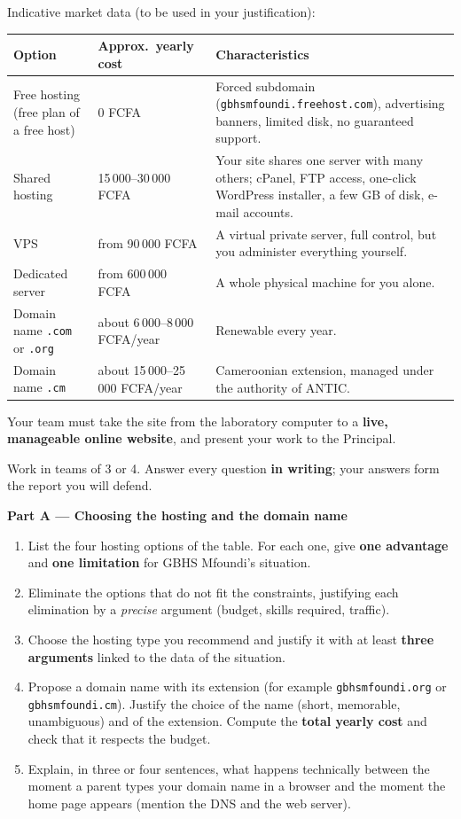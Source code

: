 \documentclass[11pt]{article}
\newcommand{\cle}[1]{{\popxbold\color{popdark}#1}}
\newcounter{popsec}
\newcounter{popsub}
\newcommand{\courssub}[1]{%
  \stepcounter{popsub}%
  \par\vspace{9pt}\noindent{\popxbold\fontsize{11.5}{13}\selectfont\color{popink}{\color{poporange}\thepopsec.\thepopsub}\hspace{6pt}#1}\par\nopagebreak\vspace{4pt}
}
\begin{document}
Indicative market data (to be used in your justification):

\begin{center}
\begin{tabularx}{\linewidth}{|l|X|X|}
\hline
\rowcolor{popblueL} \textbf{Option} & \textbf{Approx.\ yearly cost} & \textbf{Characteristics} \\
\hline
Free hosting (free plan of a free host) & 0 FCFA & Forced subdomain (\texttt{gbhsmfoundi.freehost.com}), advertising banners, limited disk, no guaranteed support. \\
\hline
Shared hosting & 15\,000--30\,000 FCFA & Your site shares one server with many others; cPanel, FTP access, one-click WordPress installer, a few GB of disk, e-mail accounts. \\
\hline
VPS & from 90\,000 FCFA & A virtual private server, full control, but you administer everything yourself. \\
\hline
Dedicated server & from 600\,000 FCFA & A whole physical machine for you alone. \\
\hline
Domain name \texttt{.com} or \texttt{.org} & about 6\,000--8\,000 FCFA/year & Renewable every year. \\
\hline
Domain name \texttt{.cm} & about 15\,000--25\,000 FCFA/year & Cameroonian extension, managed under the authority of ANTIC. \\
\hline
\end{tabularx}
\end{center}

Your team must take the site from the laboratory computer to a \textbf{live, manageable online website}, and present your work to the Principal.

\courssub{Tasks}

Work in teams of 3 or 4. Answer every question \textbf{in writing}; your answers form the report you will defend.

\textbf{Part A — Choosing the hosting and the domain name}

\begin{enumerate}
\item List the four hosting options of the table. For each one, give \textbf{one advantage} and \textbf{one limitation} for GBHS Mfoundi's situation.
\item Eliminate the options that do not fit the constraints, justifying each elimination by a \emph{precise} argument (budget, skills required, traffic).
\item Choose the hosting type you recommend and justify it with at least \textbf{three arguments} linked to the data of the situation.
\item Propose a domain name with its extension (for example \texttt{gbhsmfoundi.org} or \texttt{gbhsmfoundi.cm}). Justify the choice of the name (short, memorable, unambiguous) and of the extension. Compute the \textbf{total yearly cost} and check that it respects the budget.
\item Explain, in three or four sentences, what happens technically between the moment a parent types your domain name in a browser and the moment the home page appears (mention the \cle{DNS} and the web server).
\end{enumerate}
\end{document}
